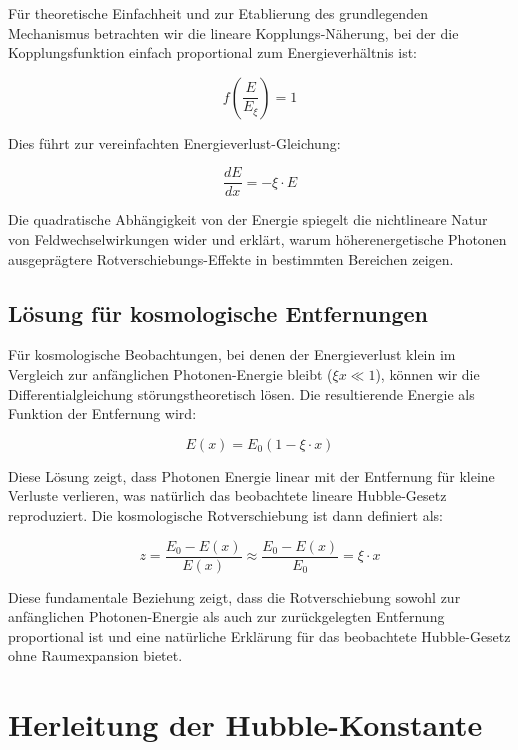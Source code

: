 \documentclass[12pt,a4paper]{article}
\begin{document}
	Für theoretische Einfachheit und zur Etablierung des grundlegenden Mechanismus betrachten wir die lineare Kopplungs-Näherung, bei der die Kopplungsfunktion einfach proportional zum Energieverhältnis ist:
	
	\begin{equation}
		f\left(\frac{E}{E_\xi}\right) = 1
	\end{equation}
	
	Dies führt zur vereinfachten Energieverlust-Gleichung:
	
	\begin{equation}
		\frac{dE}{dx} = -\xi \cdot E
	\end{equation}
	
	Die quadratische Abhängigkeit von der Energie spiegelt die nichtlineare Natur von Feldwechselwirkungen wider und erklärt, warum höherenergetische Photonen ausgeprägtere Rotverschiebungs-Effekte in bestimmten Bereichen zeigen.
	
	\subsection{Lösung für kosmologische Entfernungen}
	
	Für kosmologische Beobachtungen, bei denen der Energieverlust klein im Vergleich zur anfänglichen Photonen-Energie bleibt ($\xi x \ll 1$), können wir die Differentialgleichung störungstheoretisch lösen. Die resultierende Energie als Funktion der Entfernung wird:
	
	\begin{equation}
		E(x) = E_0 \left(1 - \xi \cdot x\right)
	\end{equation}
	
	Diese Lösung zeigt, dass Photonen Energie linear mit der Entfernung für kleine Verluste verlieren, was natürlich das beobachtete lineare Hubble-Gesetz reproduziert. Die kosmologische Rotverschiebung ist dann definiert als:
	
	\begin{equation}
		z = \frac{E_0 - E(x)}{E(x)} \approx \frac{E_0 - E(x)}{E_0} = \xi \cdot x
	\end{equation}
	
	Diese fundamentale Beziehung zeigt, dass die Rotverschiebung sowohl zur anfänglichen Photonen-Energie als auch zur zurückgelegten Entfernung proportional ist und eine natürliche Erklärung für das beobachtete Hubble-Gesetz ohne Raumexpansion bietet.
	
	\section{Herleitung der Hubble-Konstante}
	
\end{document}
